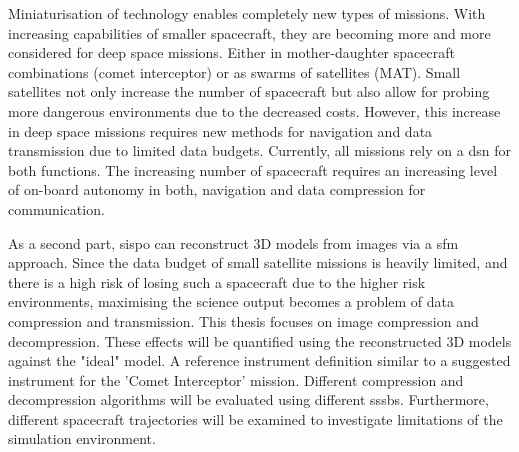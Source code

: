 Miniaturisation of technology enables completely new types of missions. With increasing capabilities of smaller spacecraft, they are becoming more and more considered for deep space missions. Either in mother-daughter spacecraft combinations (comet interceptor) or as swarms of satellites (MAT). Small satellites not only increase the number of spacecraft but also allow for probing more dangerous environments due to the decreased costs. However, this increase in deep space missions requires new methods for navigation and data transmission due to limited data budgets. Currently, all missions rely on a \gls{dsn} for both functions. The increasing number of spacecraft requires an increasing level of on-board autonomy in both, navigation and data compression for communication.

As a second part, \gls{sispo} can reconstruct 3D models from images via a \gls{sfm} approach. Since the data budget of small satellite missions is heavily limited, and there is a high risk of losing such a spacecraft due to the higher risk environments, maximising the science output becomes a problem of data compression and transmission. 
This thesis focuses on image compression and decompression. These effects will be quantified using the reconstructed 3D models against the "ideal" model. A reference instrument definition similar to a suggested instrument for the 'Comet Interceptor' mission. Different compression and decompression algorithms will be evaluated using different \gls{sssb}s. Furthermore, different spacecraft trajectories will be examined to investigate limitations of the simulation environment.
